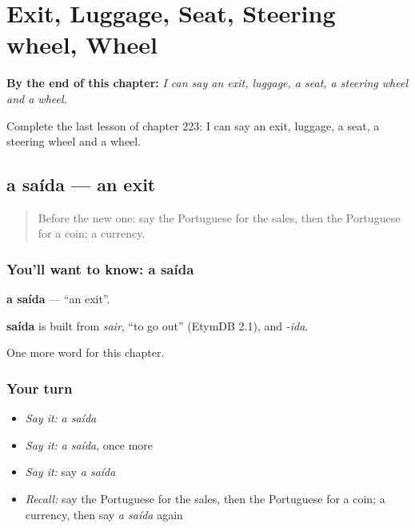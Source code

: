 
\chapter{Exit, Luggage, Seat, Steering wheel, Wheel}
\label{ch:pt-exit-luggage-seat-steering-wheel-wheel}

\begin{chapteropening}
\textbf{By the end of this chapter:} \emph{I can say an exit, luggage, a seat, a steering wheel and a wheel.}

Complete the last lesson of chapter 223: I can say an exit, luggage, a seat, a steering wheel and a wheel.
\end{chapteropening}

\section[a saída]{a saída — an exit}

\label{lesson:PT-C223-saida}



\begin{quote}
Before the new one: say the Portuguese for the sales, then the Portuguese for a coin; a currency.
\end{quote}

\subsection*{You'll want to know: a saída}
\textbf{a saída} — \textquotedblleft{}an exit\textquotedblright{}.

\begin{cousinweb}
\textbf{saída} is built from \emph{sair}, \textquotedblleft{}to go out\textquotedblright{} (EtymDB 2.1), and \emph{-ida}.
\end{cousinweb}

\begin{grammarlens}[title={What you've built}]
One more word for this chapter.
\end{grammarlens}

\subsection*{Your turn}
\begin{itemize}
\raggedright
  \item \emph{Say it:} \emph{a saída}
  \item \emph{Say it:} \emph{a saída}, once more
  \item \emph{Say it:} say \emph{a saída}
  \item \emph{Recall:} say the Portuguese for the sales, then the Portuguese for a coin; a currency, then say \emph{a saída} again
\end{itemize}

